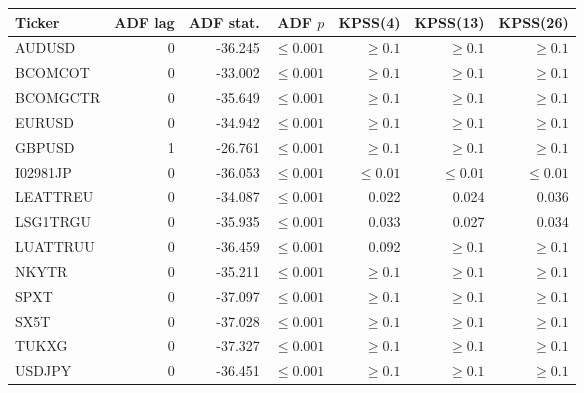 \par\medskip\noindent
{\small
\begin{tabular}{@{}lrrrrrr@{}}
\toprule
Ticker & ADF lag & ADF stat. & ADF $p$ & KPSS(4) & KPSS(13) & KPSS(26)\\
\midrule
AUDUSD & 0 & -36.245 & $\leq 0.001$ & $\geq 0.1$ & $\geq 0.1$ & $\geq 0.1$\\
BCOMCOT & 0 & -33.002 & $\leq 0.001$ & $\geq 0.1$ & $\geq 0.1$ & $\geq 0.1$\\
BCOMGCTR & 0 & -35.649 & $\leq 0.001$ & $\geq 0.1$ & $\geq 0.1$ & $\geq 0.1$\\
EURUSD & 0 & -34.942 & $\leq 0.001$ & $\geq 0.1$ & $\geq 0.1$ & $\geq 0.1$\\
GBPUSD & 1 & -26.761 & $\leq 0.001$ & $\geq 0.1$ & $\geq 0.1$ & $\geq 0.1$\\
I02981JP & 0 & -36.053 & $\leq 0.001$ & $\leq 0.01$ & $\leq 0.01$ & $\leq 0.01$\\
LEATTREU & 0 & -34.087 & $\leq 0.001$ & 0.022 & 0.024 & 0.036\\
LSG1TRGU & 0 & -35.935 & $\leq 0.001$ & 0.033 & 0.027 & 0.034\\
LUATTRUU & 0 & -36.459 & $\leq 0.001$ & 0.092 & $\geq 0.1$ & $\geq 0.1$\\
NKYTR & 0 & -35.211 & $\leq 0.001$ & $\geq 0.1$ & $\geq 0.1$ & $\geq 0.1$\\
SPXT & 0 & -37.097 & $\leq 0.001$ & $\geq 0.1$ & $\geq 0.1$ & $\geq 0.1$\\
SX5T & 0 & -37.028 & $\leq 0.001$ & $\geq 0.1$ & $\geq 0.1$ & $\geq 0.1$\\
TUKXG & 0 & -37.327 & $\leq 0.001$ & $\geq 0.1$ & $\geq 0.1$ & $\geq 0.1$\\
USDJPY & 0 & -36.451 & $\leq 0.001$ & $\geq 0.1$ & $\geq 0.1$ & $\geq 0.1$\\
\bottomrule
\end{tabular}
}
\par\medskip
